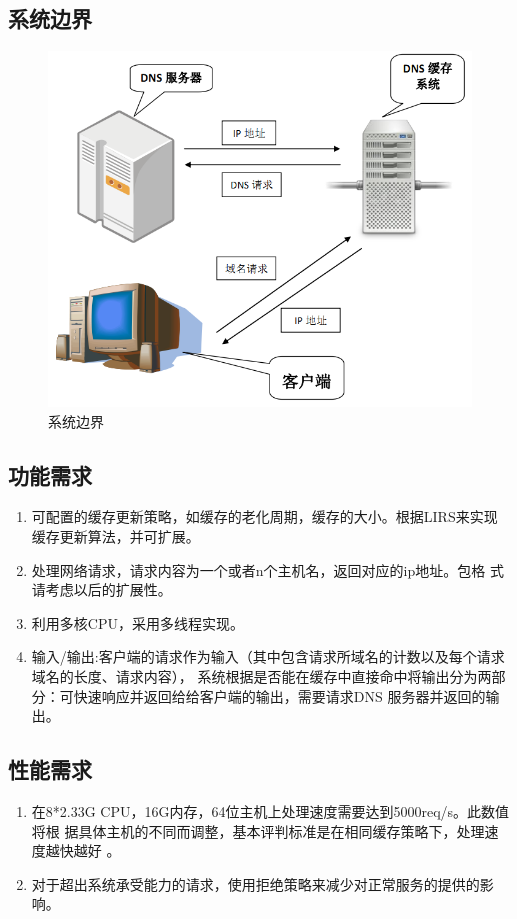 \documentclass[12pt, a4paper, titlepage]{article}
\begin{document}
\subsection{系统边界}

\begin{figure}[H]
\centering
\includegraphics[keepaspectratio, scale=0.6]{pitures/dnsxitongbianjie.png}
\caption{系统边界}
\end{figure}

\subsection{功能需求}
\begin{enumerate}

	\item{可配置的缓存更新策略，如缓存的老化周期，缓存的大小。根据LIRS来实现
	缓存更新算法，并可扩展。}
	\item{处理网络请求，请求内容为一个或者n个主机名，返回对应的ip地址。包格
	式请考虑以后的扩展性。}
	\item{利用多核CPU，采用多线程实现。}
	\item{输入/输出:客户端的请求作为输入（其中包含请求所域名的计数以及每个请求域名的长度、请求内容），
	系统根据是否能在缓存中直接命中将输出分为两部分：可快速响应并返回给给客户端的输出，需要请求DNS
	服务器并返回的输出。}
	
\end{enumerate}
\subsection{性能需求}
\begin{enumerate}

	\item{在8*2.33G CPU，16G内存，64位主机上处理速度需要达到5000req/s。此数值将根
	据具体主机的不同而调整，基本评判标准是在相同缓存策略下，处理速度越快越好
	。}
	\item{对于超出系统承受能力的请求，使用拒绝策略来减少对正常服务的提供的影
	响。}
\end{enumerate}
\end{document}
